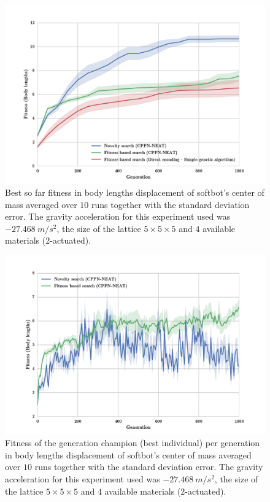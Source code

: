\begin{figure}[h!]
\centering
\includegraphics[width=1.0\textwidth]{Figures/Results/FitvsNovVsDirSize5.pdf}
\caption{Best so far fitness in body lengths displacement of softbot's center of mass averaged over $10$ runs together with the standard deviation error. The gravity acceleration for this experiment used was $-27.468\   m/s^2$, the size of the lattice $5\times 5\times5$ and $4$ available materials ($2$-actuated).}
\label{fig:FitvsNovVsDirSize5}
\end{figure}

\begin{figure}[h!]
\centering
\includegraphics[width=1.0\textwidth]{Figures/Results/AvgGenerChampNoveltyFitnessSize5.pdf}
\caption{Fitness of the generation champion (best individual) per generation in body lengths displacement of softbot's center of mass averaged over $10$ runs together with the standard deviation error. The gravity acceleration for this experiment used was $-27.468\   m/s^2$, the size of the lattice $5\times 5\times5$ and $4$ available materials ($2$-actuated).}
\label{fig:AvgGenerChampNoveltyFitnessSize5}
\end{figure}


